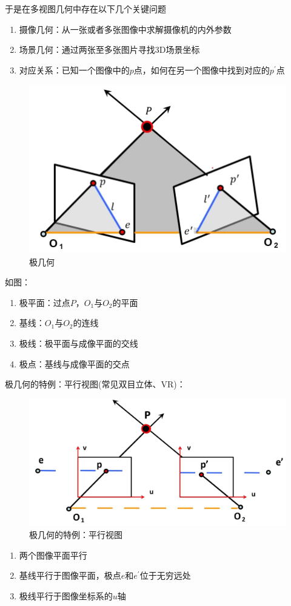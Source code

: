 \documentclass[10pt]{article}
\begin{document}
于是在多视图几何中存在以下几个关键问题
\begin{enumerate}
    \item 摄像几何：从一张或者多张图像中求解摄像机的内外参数
    \item 场景几何：通过两张至多张图片寻找3D场景坐标
    \item 对应关系：已知一个图像中的$p$点，如何在另一个图像中找到对应的$p^{'}$点
\end{enumerate}
\begin{figure}[!htb]
    \includegraphics[width=\hsize]{images/极几何.png}
    \caption{极几何} 
\end{figure}
如图：
\begin{enumerate}
    \item 极平面：过点$P$，$O_{1}$与$O_{2}$的平面
    \item 基线：$O_{1}$与$O_{2}$的连线
    \item 极线：极平面与成像平面的交线
    \item 极点：基线与成像平面的交点
\end{enumerate}
极几何的特例：平行视图(常见双目立体、VR)：
\begin{figure}[!htb]
    \includegraphics[width=\hsize]{images/平行视图.png}
    \caption{极几何的特例：平行视图} 
\end{figure}
\begin{enumerate}
    \item 两个图像平面平行
    \item 基线平行于图像平面，极点$e$和$e^{'}$位于无穷远处
    \item 极线平行于图像坐标系的$u$轴
\end{enumerate}
\end{document}
